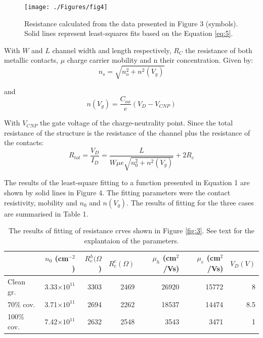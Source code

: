 \documentclass[preprint,aip,jap]{revtex4-2}
\begin{document}
\begin{figure}[htb]
  \centering
   \texttt{[image: ./Figures/fig4]}  
  \caption{Resistance calculated from the data presented in Figure 3 (symbols). Solid lines represent least-squares fits based on the Equation \ref{eq:5}.}
  \label{fig:4}
\end{figure}

\noindent With $W$ and $L$ channel width and length respectively, $R_{C}$ the resistance of both metallic contacts, $\mu$ charge carrier mobility and n their concentration. Given by:
\begin{equation}
  \label{eq:3}
  n_{s}=\sqrt{n_{o}^{2}+n^{2}(V_{g})}
\end{equation}

and 
\begin{equation}
  \label{eq:4}
  n(V_{g})= \frac{C_{ox}}{e}(V_{D}- V_{CNP})
\end{equation}


\noindent With $V_{CNP}$ the gate voltage of the charge-neutrality point\cite{xia-2010}. Since the total resistance of the structure is the resistance of the channel plus the resistance of the contacts:
\begin{equation}
  \label{eq:5}
  R_{tot} = \frac{V_{D}}{I_{D}} = \frac{L}{W\mu e\sqrt{n_{0}^{2}+n^{2}(V_{g})}} +2 R_{c}
\end{equation}


\noindent The results of the least-square fitting to a function presented in Equation 1 are shown by solid lines in Figure 4. The fitting parameters were the contact resistivity, mobility and $n_0$ and $n(V_g)$.  The results of fitting for the three cases are summarised in Table 1.
\noindent \begin{table}[h]
  \centering
  \begin{tabular}{|l|r|r|r|r|r|r|} \hline%
   & $n_{0}$ (cm$^{-2}$ )& $R_{c}^{h}(\Omega$) & $R_{c}^{e}(\Omega)$ & $\mu_{h}$ (cm$^{2}$/Vs) & $\mu_{e}$ (cm$^{2}$/Vs) & $V_{D}(V) $  \\ \hline%
    Clean gr. & 3.33$\times 10^{11}$ & 3303 & 2469 & 26920 & 15772 & 8 \\
    70\% cov. &3.71$\times 10^{11}$ & 2694 & 2262 & 18537 & 14474 & 8.5 \\
     100\% cov. &7.42$\times 10^{11}$ & 2632 & 2548 & 3543 & 3471 & 1 \\ \hline
    
  \end{tabular}
  \caption{The results of fitting of resistance crves shown in Figure \ref{fig:3}. See  text for the explantaion of the parameters.}
  \label{tab:1}
\end{table}
\end{document}

